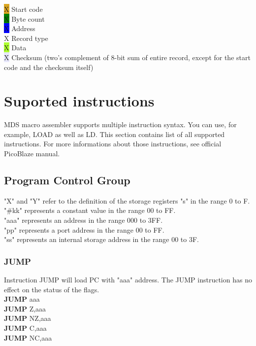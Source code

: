 \begin{code}[h]
        \colorbox{Goldenrod}{\color{Goldenrod}X} Start code\\
        \colorbox{green}{\color{green}X} Byte count\\
        \colorbox{blue}{\color{blue}X} Address\\
        \colorbox{Apricot}{\color{Apricot}X} Record type\\
        \colorbox{GreenYellow}{\color{GreenYellow}X} Data\\
        \colorbox{Lavender}{\color{Lavender}X} Checksum (two's complement of 8-bit sum of entire record, except for the start code and the checksum itself)
    \end{code}

\section{Suported instructions}
    MDS macro assembler supports multiple instruction syntax. You can use, for example, LOAD as well as LD. This section contains list of all supported instructions. For more informations about those instructions, see official PicoBlaze manual.\\

    \subsection{Program Control Group}
        "X" and "Y" refer to the definition of the storage registers "s" in the range 0 to F.\\
        "\#kk" represents a constant value in the range 00 to FF.\\
        "aaa" represents an address in the range 000 to 3FF.\\
        "pp" represents a port address in the range 00 to FF.\\
        "ss" represents an internal storage address in the range 00 to 3F.\\

        \subsubsection{JUMP}
            Instruction JUMP will load PC with "aaa" address. The JUMP instruction has no effect on the status of the flags.\\
            \textbf{JUMP} aaa\\
            \textbf{JUMP} Z,aaa\\
            \textbf{JUMP} NZ,aaa\\
            \textbf{JUMP} C,aaa\\
            \textbf{JUMP} NC,aaa\\

